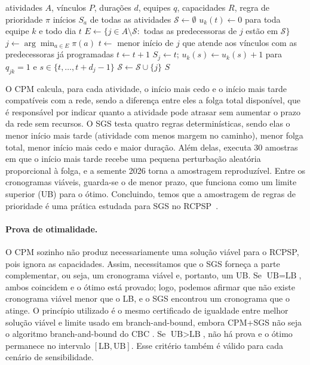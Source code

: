 \begin{algorithm}[htbp]
  \caption{Esquema serial de geração de cronogramas.}
  \label{alg:sgs}
  \small
  \begin{algorithmic}[1]
    \Require atividades $A$, vínculos $P$, durações $d$, equipes $q$,
      capacidades $R$, regra de prioridade $\pi$
    \Ensure inícios $S_a$ de todas as atividades
    \State $\mathcal{S}\gets\emptyset$ 
    \State $u_k(t)\gets 0$ para toda equipe $k$ e todo dia $t$
      \State $E\gets\{j\in A\setminus\mathcal{S}:$ todas as
        predecessoras de $j$ estão em $\mathcal{S}\}$
      \State $j\gets\arg\min_{a\in E}\pi(a)$
      \State $t\gets$ menor início de $j$ que atende aos vínculos com as
        predecessoras já programadas
        \State $t\gets t+1$
      \EndWhile
      \State $S_j\gets t$; \; $u_k(s)\gets u_k(s)+1$ para $q_{jk}=1$ e
        $s\in\{t,\ldots,t+d_j-1\}$
      \State $\mathcal{S}\gets\mathcal{S}\cup\{j\}$
    \EndWhile
    \State \Return $S$
  \end{algorithmic}
\end{algorithm}

O CPM calcula, para cada atividade, o início mais cedo e o início mais tarde compatíveis com a rede, sendo a diferença entre eles a folga total disponível, que é responsável por indicar quanto a atividade pode atrasar sem aumentar o prazo da rede sem
recursos. O SGS testa quatro regras determinísticas, sendo elas o menor início mais
tarde (atividade com menos margem no caminho), menor folga total, menor
início mais cedo e maior duração. Além delas, executa 30 amostras em que o
início mais tarde recebe uma pequena perturbação aleatória proporcional à
folga, e a semente 2026 torna a amostragem reproduzível. Entre os
cronogramas viáveis, guarda-se o de menor prazo, que funciona como um limite superior
(UB) para o ótimo. Concluindo, temos que a amostragem de regras de prioridade é uma prática
estudada para SGS no RCPSP~\cite{kolisch1996}.

\paragraph{Prova de otimalidade.}
O CPM sozinho não produz necessariamente uma solução viável para o
RCPSP, pois ignora as capacidades. Assim, necessitamos que o SGS forneça a parte complementar, ou seja, um
cronograma viável e, portanto, um UB. Se $\text{UB}=\text{LB}$, ambos
coincidem e o ótimo está provado; logo, podemos afirmar que não existe cronograma viável menor que
o LB, e o SGS encontrou um cronograma que o atinge. O princípio utilizado é o mesmo certificado
de igualdade entre melhor solução viável e limite usado em branch-and-bound,
embora CPM+SGS não seja o algoritmo branch-and-bound do CBC
\cite{forrest2005cbc}. Se $\text{UB}>\text{LB}$, não há prova e o ótimo
permanece no intervalo $[\text{LB},\text{UB}]$. Esse critério também é válido
para cada cenário de sensibilidade.

